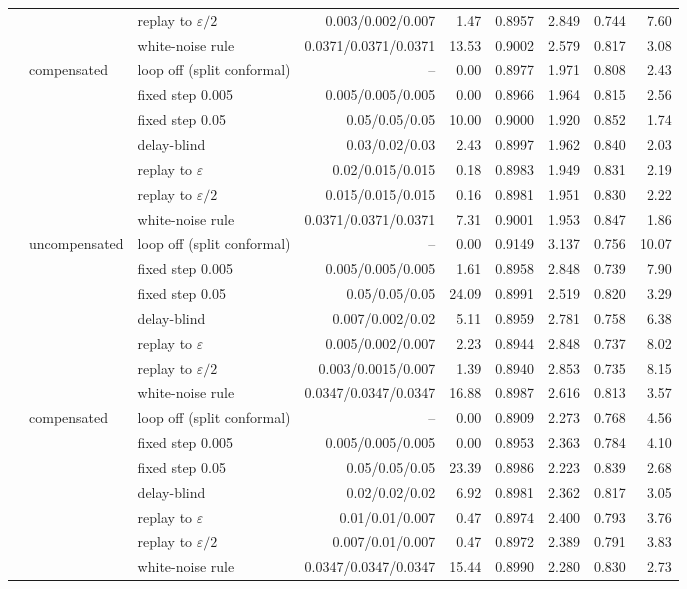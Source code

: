 \begin{tabular}{@{}rllrrrrrr@{}}
 &  & replay to $\varepsilon/2$ & 0.003/0.002/0.007 & 1.47 & 0.8957 & 2.849 & 0.744 & 7.60 \\
 &  & white-noise rule & 0.0371/0.0371/0.0371 & 13.53 & 0.9002 & 2.579 & 0.817 & 3.08 \\
 & compensated & loop off (split conformal) & -- & 0.00 & 0.8977 & 1.971 & 0.808 & 2.43 \\
 &  & fixed step 0.005 & 0.005/0.005/0.005 & 0.00 & 0.8966 & 1.964 & 0.815 & 2.56 \\
 &  & fixed step 0.05 & 0.05/0.05/0.05 & 10.00 & 0.9000 & 1.920 & 0.852 & 1.74 \\
 &  & delay-blind & 0.03/0.02/0.03 & 2.43 & 0.8997 & 1.962 & 0.840 & 2.03 \\
 &  & replay to $\varepsilon$ & 0.02/0.015/0.015 & 0.18 & 0.8983 & 1.949 & 0.831 & 2.19 \\
 &  & replay to $\varepsilon/2$ & 0.015/0.015/0.015 & 0.16 & 0.8981 & 1.951 & 0.830 & 2.22 \\
 &  & white-noise rule & 0.0371/0.0371/0.0371 & 7.31 & 0.9001 & 1.953 & 0.847 & 1.86 \\
\addlinespace
4 & uncompensated & loop off (split conformal) & -- & 0.00 & 0.9149 & 3.137 & 0.756 & 10.07 \\
 &  & fixed step 0.005 & 0.005/0.005/0.005 & 1.61 & 0.8958 & 2.848 & 0.739 & 7.90 \\
 &  & fixed step 0.05 & 0.05/0.05/0.05 & 24.09 & 0.8991 & 2.519 & 0.820 & 3.29 \\
 &  & delay-blind & 0.007/0.002/0.02 & 5.11 & 0.8959 & 2.781 & 0.758 & 6.38 \\
 &  & replay to $\varepsilon$ & 0.005/0.002/0.007 & 2.23 & 0.8944 & 2.848 & 0.737 & 8.02 \\
 &  & replay to $\varepsilon/2$ & 0.003/0.0015/0.007 & 1.39 & 0.8940 & 2.853 & 0.735 & 8.15 \\
 &  & white-noise rule & 0.0347/0.0347/0.0347 & 16.88 & 0.8987 & 2.616 & 0.813 & 3.57 \\
 & compensated & loop off (split conformal) & -- & 0.00 & 0.8909 & 2.273 & 0.768 & 4.56 \\
 &  & fixed step 0.005 & 0.005/0.005/0.005 & 0.00 & 0.8953 & 2.363 & 0.784 & 4.10 \\
 &  & fixed step 0.05 & 0.05/0.05/0.05 & 23.39 & 0.8986 & 2.223 & 0.839 & 2.68 \\
 &  & delay-blind & 0.02/0.02/0.02 & 6.92 & 0.8981 & 2.362 & 0.817 & 3.05 \\
 &  & replay to $\varepsilon$ & 0.01/0.01/0.007 & 0.47 & 0.8974 & 2.400 & 0.793 & 3.76 \\
 &  & replay to $\varepsilon/2$ & 0.007/0.01/0.007 & 0.47 & 0.8972 & 2.389 & 0.791 & 3.83 \\
 &  & white-noise rule & 0.0347/0.0347/0.0347 & 15.44 & 0.8990 & 2.280 & 0.830 & 2.73 \\
\bottomrule
\end{tabular}
